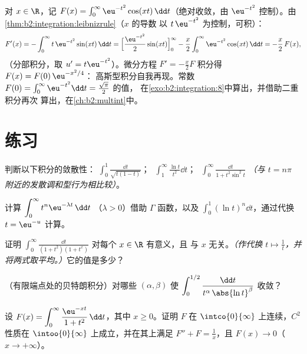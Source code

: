 \begin{example}[通过求导的一个经典计算]\label{ex:b2:integration:laplace}
对 $x \in \R$，记 $F(x) = \int_0^{\infty} \eu^{-t^2}\cos(xt)\,\dd
t$（绝对收敛，由 $\eu^{-t^2}$ 控制）。由
\cref{thm:b2:integration:leibnizrule}（$x$ 的导数
以 $t\,\eu^{-t^2}$ 为控制，可积）：
\[
F'(x) = -\int_0^\infty t\,\eu^{-t^2}\sin(xt)\,\dd t
= \Bigl[\frac{\eu^{-t^2}}{2}\sin(xt)\Bigr]_0^\infty
- \frac x2\int_0^\infty \eu^{-t^2}\cos(xt)\,\dd t
= -\frac x2\,F(x),
\]
（分部积分，取 $u' = t\eu^{-t^2}$）。微分方程 $F' =
-\frac x2 F$ 积分得 $F(x) = F(0)\,\eu^{-x^2/4}$：
高斯型积分自我再现。常数 $F(0) =
\int_0^\infty \eu^{-t^2}\dd t = \frac{\sqrt\pi}{2}$ 的值，
在\cref{exo:b2:integration:8}中算出，并借助二重积分再次
算出，在\cref{ch:b2:multint}中。
\end{example}

\section{练习}

\begin{exercise}[$\star$]\label{exo:b2:integration:1}
判断以下积分的敛散性：
$\displaystyle\int_0^1 \frac{\dd t}{\sqrt{t(1-t)}}$；
$\;\displaystyle\int_1^\infty \frac{\ln t}{t^2}\dd t$；
$\;\displaystyle\int_0^\infty \frac{\dd t}{1 + t^2\sin^2 t}$
\emph{（与 $t =
n\pi$ 附近的发散调和型行为相比较）}。
\end{exercise}

\begin{exercise}[$\star$]\label{exo:b2:integration:2}
计算 $\displaystyle\int_0^\infty t^n \eu^{-\lambda t}\,\dd t$
（$\lambda > 0$）借助 $\Gamma$ 函数，以及
$\displaystyle\int_0^1 (\ln t)^n \dd t$，通过代换 $t =
\eu^{-u}$ 计算。
\end{exercise}

\begin{exercise}[$\star$]\label{exo:b2:integration:3}
证明 $\displaystyle\int_0^{\infty} \frac{\dd t}{(1 +
t^2)(1 + t^x)}$ 对每个 $x \in \R$ 有意义，且
与 $x$ 无关。\emph{（作代换 $t \mapsto \frac1t$，并
将两式取平均。）}它的值是多少？
\end{exercise}

\begin{exercise}[$\star\star$]\label{exo:b2:integration:4}
（有限端点处的贝特朗积分）对哪些 $(\alpha,
\beta)$ 使 $\displaystyle\int_0^{1/2}
\frac{\dd t}{t^\alpha\,\abs{\ln t}^\beta}$ 收敛？
\end{exercise}

\begin{exercise}[$\star\star$]\label{exo:b2:integration:5}
设 $F(x) = \displaystyle\int_0^{\infty} \frac{\eu^{-xt}}{1 +
t^2}\,\dd t$，其中 $x \geq 0$。证明 $F$ 在
$\intco{0}{\infty}$ 上连续，$C^2$ 性质在 $\intoo{0}{\infty}$ 上成立，并在其上满足 $F'' +
F = \frac1x$，且 $F(x) \to 0$（$x \to +\infty$）。
\end{exercise}

